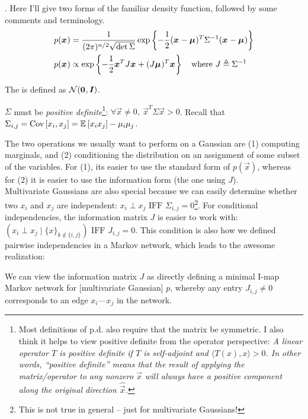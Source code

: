 \documentclass[11pt]{article}
\begin{document}
\p {}. Here I'll give two forms of the familiar density function, followed by some comments and terminology.
\begin{align}
	p(\bm{x}_{}) 
		&= \frac{1}{(2\pi)^{n/2} \sqrt{\det \Sigma}}
			\exp\left\{ 
				-\frac{1}{2} (\bm{x}_{} - \bm{\mu}_{})^T \Sigma^{-1} (\bm{x}_{} - \bm{\mu}_{})
			\right\} \\
	p(\bm{x}_{}) 
		&\propto \exp\left\{ - \frac{1}{2} \bm{x}_{}^T J \bm{x}_{} + (J \bm{\mu}_{})^T \bm{x}_{}  \right\}
		\quad \text{where } J \triangleq \Sigma^{-1}
\end{align}
\begin{compactitem}
	\item The  is defined as $\mathcal{N}(\bm{0}_{}, \bm{I}_{})$.
	
	\item $\Sigma$ must be \textit{positive definite}\footnote{Most definitions of p.d. also require that the matrix be symmetric. I also think it helps to view positive definite from the operator perspective: \textit{A linear operator $T$ is positive definite if $T$ is self-adjoint and $\langle T(x), x \rangle > 0$. In other words, ``positive definite'' means that the result of applying the matrix/operator to any nonzero $\vec x$ will always have a positive component along the original direction $\hat{\vec x}$. }}: $\forall \vec x \ne 0, ~ \vec{x}^T \Sigma \vec x > 0$. Recall that $\Sigma_{i,j} = \text{Cov}\left[ x_i, x_j \right] = \mathbb{E}_{}\left[x_i x_j\right] - \mu_i \mu_j$.
\end{compactitem}
The two operations we usually want to perform on a Gaussian are (1) computing marginals, and (2) conditioning the distribution on an assignment of some subset of the variables. For (1), its easier to use the standard form of $p(\vec x)$, whereas for (2) it is easier to use the information form (the one using $J$). \\

Multivariate Gaussians are also special because we can easily determine whether two $x_i$ and $x_j$ are independent: $x_i \perp x_j \text{  IFF  } \Sigma_{i,j}=0$\footnote{This is not true in general -- just for multivariate Gaussians!}. For conditional independencies, the information matrix $J$ is easier to work with: $(x_i \perp x_j \mid \{x\}_{k \notin \{i,j\}}) \text{  IFF  } J_{i,j}=0$. This condition is also how we defined pairwise independencies in a Markov network, which leads to the awesome realization:
\begin{definition}
	We can view the information matrix $J$ as directly defining a minimal I-map Markov network for [multivariate Gaussian] $p$, whereby any entry $J_{i,j} \ne 0$ corresponds to an edge $x_i \text{---} x_j$ in the network.
\end{definition}
\end{document}
